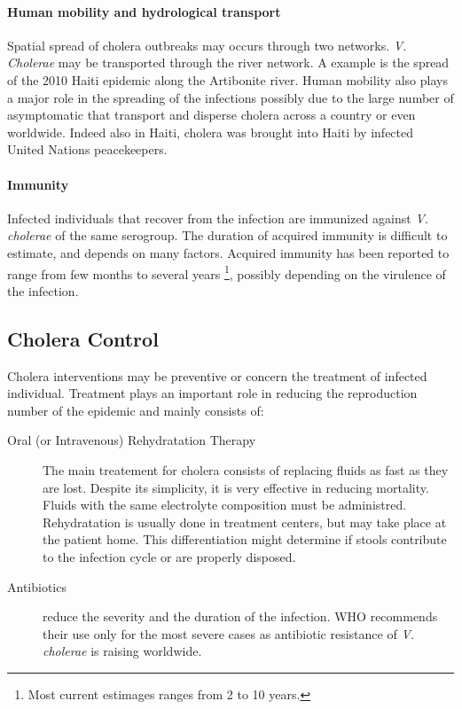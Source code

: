 \paragraph{Human mobility and hydrological transport} Spatial spread of cholera outbreaks may occurs through two networks. \textit{V. Cholerae} may be transported through the river network. A example is the spread of the 2010 Haiti epidemic along the Artibonite river\cite{Piarroux:UnderstandingCholeraEpidemic:2011}. Human mobility also plays a major role in the spreading of the infections possibly due to the large number of asymptomatic that transport and disperse cholera across a country or even worldwide.  Indeed also in Haiti, cholera was brought into Haiti by infected United Nations peacekeepers\cite{Piarroux:UnderstandingCholeraEpidemic:2011}. %

\paragraph{Immunity} Infected individuals that recover from the infection are immunized against \textit{V. cholerae}  of the same serogroup. The duration of acquired immunity is difficult to estimate, and depends on many factors. Acquired immunity has been reported to range from few months to several years \footnote{Most current estimages ranges from 2 to 10 years.}, possibly depending on the virulence of the infection\cite{Levine:DurationInfectionDerivedImmunity:1981,Kaper:Cholera:1995,Woodward:CholeraReinfectionMan:1971,Glass:SeroepidemiologicalStudiesEI:1985,Clemens:BiotypeDeterminantNatural:1991,Leung:ProtectionAffordedPrevious:2021}.

\subsection{Cholera Control} 
Cholera interventions may be preventive or concern the treatment of infected individual. Treatment plays an important role in reducing the reproduction number of the epidemic and mainly consists of:
\begin{description}
\item[Oral (or Intravenous) Rehydratation Therapy] The main treatement for cholera consists of replacing fluids as fast as they are lost. Despite its simplicity, it is very effective in reducing mortality. Fluids with the same electrolyte composition must be administred\cite{Kuhn:GlucoseNotRiceBased:2014}.  Rehydratation is usually done in treatment centers, but may take place at the patient home. This differentiation might determine if stools contribute to the infection cycle or are properly disposed.
\item[Antibiotics] reduce the severity and the duration of the infection. WHO recommends their use only for the most severe cases as antibiotic resistance of \emph{V. cholerae} is raising worldwide\cite{Sack:GettingSeriousCholera:2006}.
\end{description}

